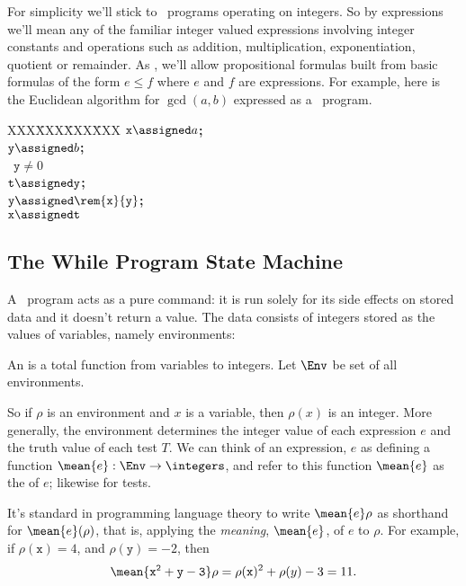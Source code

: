For simplicity we'll stick to \while\ programs operating on integers.  So by
expressions we'll mean any of the familiar integer valued
expressions involving integer constants and operations such as addition,
multiplication, exponentiation, quotient or remainder.  As ,
we'll allow propositional formulas built from basic formulas of the form
$e \leq f$ where $e$ and $f$ are expressions.  For example, here is the
Euclidean algorithm for $\gcd(a,b)$ expressed as a \while\ program.
\begin{tabbing}
XXX\=XXX\=XXX\=XXX\kill
$\mathtt{x} \assigned a$\textbf{;} \\
$\mathtt{y} \assigned b$\textbf{;} \\
\while\ $\mathtt{y} \neq 0$ \docomm\\
   \> $\mathtt{t} \assigned \mathtt{y}$\textbf{;}\\
   \> $\mathtt{y} \assigned \rem{\mathtt{x}}{\mathtt{y}}$\textbf{;}\\
   \> $\mathtt{x} \assigned \mathtt{t}$
\odcomm\\
\end{tabbing}

\subsection{The \textbf{While}  Program State Machine}

A \while\ program acts as a pure command: it is run solely for its
side effects on stored data and it doesn't return a value.  The data
consists of integers stored as the values of variables, namely
environments:
\begin{definition}
An  is a total function from variables to integers.
Let $\Env$ be set of all environments.
\end{definition}
So if $\rho$ is an environment and $x$ is a variable, then $\rho(x)$ is an
integer.  More generally, the environment determines the integer value of
each expression $e$ and the truth value of each test $T$.  We can think
of an expression, $e$ as defining a function $\mean{e}:\Env \to
\integers$, and refer to this function $\mean{e}$ as the 
of $e$; likewise for tests.

It's standard in programming language theory to write $\mean{e}\rho$
as shorthand for $\mean{e}(\rho)$, that is, applying
the \emph{meaning}, $\mean{e}$, of $e$ to $\rho$.  For example, if
$\rho(\mathtt{x}) =4$, and $\rho(\mathtt{y}) =-2$, then
\begin{equation}\label{x2y311}
\mean{\mathtt{x^2+y -3}}\rho = \rho(\mathtt{x})^2 + \rho(y) -3 = 11.
\end{equation}

